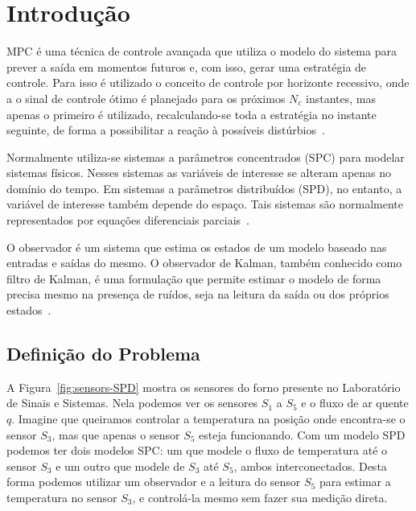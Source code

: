 
\chapter{Introdução}%
\label{chp:introducao}

\ac{MPC} é uma técnica de controle avançada que utiliza o modelo do sistema para
prever a saída em momentos futuros e, com isso, gerar uma estratégia de
controle. Para isso é utilizado o conceito de controle por horizonte recessivo,
onde a o sinal de controle ótimo é planejado para os próximos \(N_c\) instantes,
mas apenas o primeiro é utilizado, recalculando-se toda a estratégia no instante
seguinte, de forma a possibilitar a reação à possíveis
distúrbios~\cite{book:wang}.

Normalmente utiliza-se sistemas a parâmetros concentrados (\ac{SPC}) para modelar
sistemas físicos. Nesses sistemas as variáveis de interesse se alteram apenas no
domínio do tempo. Em sistemas a parâmetros distribuídos (\ac{SPD}), no entanto, a
variável de interesse também depende do espaço. Tais sistemas são normalmente
representados por equações diferenciais parciais~\cite{masterthesis:nelson}.

O observador é um sistema que estima os estados de um modelo baseado nas
entradas e saídas do mesmo. O observador de Kalman, também conhecido como filtro
de Kalman, é uma formulação que permite estimar o modelo de forma precisa mesmo
na presença de ruídos, seja na leitura da saída ou dos próprios
estados~\cite{book:wang}.

\section{Definição do Problema}%
\label{sec:definicao-do-problema}

A Figura~\ref{fig:sensors-SPD} mostra os sensores do forno presente no
Laboratório de Sinais e Sistemas. Nela podemos ver os sensores \(S_1\) a \(S_5\)
e o fluxo de ar quente \( q \). Imagine que queiramos controlar a temperatura na
posição onde encontra-se o sensor \(S_3\), mas que apenas o sensor \(S_5\)
esteja funcionando. Com um modelo \ac{SPD} podemos ter dois modelos \ac{SPC}\@:
um que modele o fluxo de temperatura até o sensor \(S_3\) e um outro que modele
de \(S_3\) até \(S_5\), ambos interconectados. Desta forma podemos utilizar um
observador e a leitura do sensor \(S_5\) para estimar a temperatura no sensor
\(S_3\), e controlá-la mesmo sem fazer sua medição direta.

